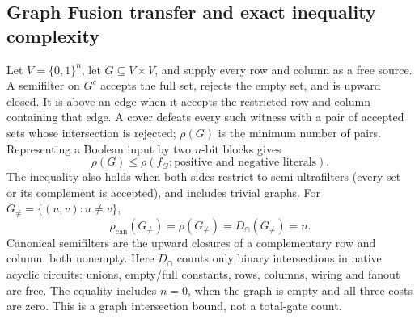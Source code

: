 \begin{result}
\subsection{Graph Fusion transfer and exact inequality complexity}
Let $V=\{0,1\}^n$, let $G\subseteq V\times V$, and supply every row and column
as a free source. A semifilter on $G^c$ accepts the full set, rejects the empty
set, and is upward closed. It is above an edge when it accepts the restricted
row and column containing that edge. A cover defeats every such witness with a
pair of accepted sets whose intersection is rejected; $\rho(G)$ is the minimum
number of pairs. Representing a Boolean input by two $n$-bit blocks gives
\[
\rho(G)\le \rho(f_G;\text{positive and negative literals}).
\]
The inequality also holds when both sides restrict to semi-ultrafilters (every
set or its complement is accepted), and includes trivial graphs.
For $G_{\ne}=\{(u,v):u\ne v\}$,
\[
\rho_{\mathrm{can}}(G_{\ne})=\rho(G_{\ne})=D_{\cap}(G_{\ne})=n.
\]
Canonical semifilters are the upward closures of a complementary row and
column, both nonempty. Here $D_{\cap}$ counts only binary intersections in
native acyclic circuits: unions, empty/full constants, rows, columns, wiring
and fanout are free. The equality includes $n=0$, when the graph is empty and
all three costs are zero. This is a graph intersection bound, not a total-gate
count.\citep{CavalarOliveira2025}
\end{result}

